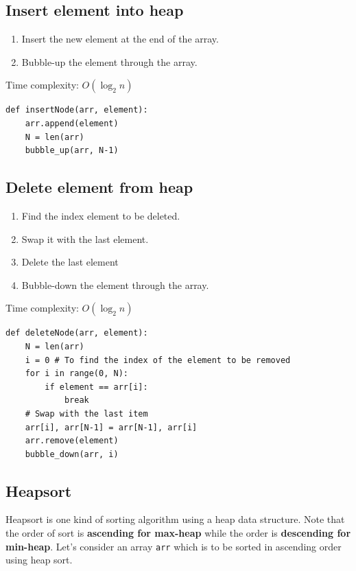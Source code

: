 \documentclass[a4paper,11pt]{book}
\begin{document}
\subsection{Insert element into heap}
\begin{enumerate}
    \item Insert the new element at the end of the array.
    \item Bubble-up the element through the array.
\end{enumerate}
\noindent Time complexity: $O(\log_2 n)$
\begin{lstlisting}
def insertNode(arr, element):
    arr.append(element)
    N = len(arr)
    bubble_up(arr, N-1)
\end{lstlisting}

\subsection{Delete element from heap}
\begin{enumerate}
    \item Find the index element to be deleted.
    \item Swap it with the last element.
    \item Delete the last element
    \item Bubble-down the element through the array.
\end{enumerate}
\noindent Time complexity: $O(\log_2 n)$
\begin{lstlisting}
def deleteNode(arr, element):
    N = len(arr)
    i = 0 # To find the index of the element to be removed
    for i in range(0, N):
        if element == arr[i]:
            break
    # Swap with the last item
    arr[i], arr[N-1] = arr[N-1], arr[i]
    arr.remove(element)
    bubble_down(arr, i)
\end{lstlisting}

\subsection{Heapsort}

\noindent Heapsort is one kind of sorting algorithm using a heap data structure. Note that the order of sort is \textbf{ascending for max-heap} while the order is \textbf{descending for min-heap}. Let's consider an array \lstinline{arr} which is to be sorted in ascending order using heap sort.
\end{document}
